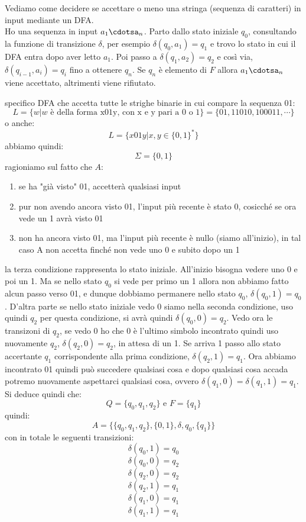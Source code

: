 Vediamo come decidere se accettare o meno una stringa (sequenza di caratteri) in input mediante un DFA.\\
Ho una sequenza in input $a_1\cdotsa_n$. Parto dallo stato iniziale $q_0$, consultando la funzione di transizione $\delta$, per esempio  $\delta(q_0,a_1)=q_1$ e trovo lo stato in cui il DFA entra dopo aver letto $a_1$. Poi passo a $\delta(q_1,a_2)=q_2$ e così via, $\delta(q_{i-1},a_i)=q_i$ fino a ottenere $q_n$. Se $q_n$ è elemento di $F$ allora $a_1\cdotsa_n$ viene accettato, altrimenti viene rifiutato.
\begin{example}
	specifico DFA che accetta tutte le strighe binarie in cui compare la sequenza 01:
	$$L=\{w|w \mbox{ è della forma x01y, con x e y pari a 0 o 1} \}=\{01,11010,100011,\cdots\}$$
	o anche:
	$$L=\{x01y| x,y\in\{0,1\}^* \}$$
	abbiamo quindi:
	$$\Sigma=\{0,1\}$$
	ragioniamo sul fatto che $A$:
	\begin{enumerate}
		\item se ha "già visto" 01, accetterà qualsiasi input
		\item pur non avendo ancora visto 01, l'input più recente è stato 0, cosicché se ora vede un 1 avrà visto 01
		\item non ha ancora visto 01, ma l'input più recente è nullo (siamo all'inizio), in tal caso A non accetta finché non vede
		      uno 0 e subito dopo un 1
	\end{enumerate}
	la terza condizione rappresenta lo stato iniziale. All'inizio bisogna vedere uno 0 e poi un 1. Ma se nello stato $q_0$ si vede per primo un 1 allora non abbiamo fatto alcun passo verso 01, e dunque dobbiamo permanere nello stato $q_0$, $\delta(q_0,1)=q_0$. D'altra parte se nello stato iniziale vedo 0 siamo nella seconda condizione, uso quindi $q_2$ per questa condizione, si avrà quindi $\delta(q_0,0)=q_2$. Vedo ora le transizoni di $q_2$, se vedo 0 ho che 0 è l'ultimo simbolo incontrato quindi uso nuovamente $q_2$, $\delta(q_2,0)=q_2$, in attesa di un 1. Se arriva 1 passo allo stato accertante $q_1$ corrispondente alla prima condizione, $\delta(q_2,1)=q_1$. Ora abbiamo incontrato 01 quindi può succedere qualsiasi cosa e dopo qualsiasi cosa accada potremo nuovamente aspettarci qualsiasi cosa, ovvero $\delta(q_1,0)=\delta(q_1,1)=q_1$. Si deduce quindi che:
	$$Q=\{q_0,q_1,q_2\} \mbox{ e } F=\{q_1\}$$
	quindi:
	$$A=\{\{q_0,q_1,q_2\} ,\{0,1\}, \delta, q_0, \{q_1\} \}$$
	con in totale le seguenti transizioni:
	$$\delta(q_0,1)=q_0$$
	$$\delta(q_0,0)=q_2$$
	$$\delta(q_2,0)=q_2$$
	$$\delta(q_2,1)=q_1$$
	$$\delta(q_1,0)=q_1$$
	$$\delta(q_1,1)=q_1$$

\end{example}
